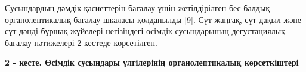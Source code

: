 {%
% 
% 
% 
% 
% 
% 

Сусындардың дәмдік қасиеттерін бағалау үшін жетілдірілген бес балдық
органолептикалық бағалау шкаласы қолданылды {[}9{]}. Сүт-жаңғақ,
сүт-дақыл және сүт-дәнді-бұршақ жүйелері негізіндегі өсімдік
сусындарының дегустациялық бағалау нәтижелері 2-кестеде көрсетілген.

{\bfseries 2 - кесте. Өсімдік сусындары үлгілерінің органолептикалық
көрсеткіштері}

}

